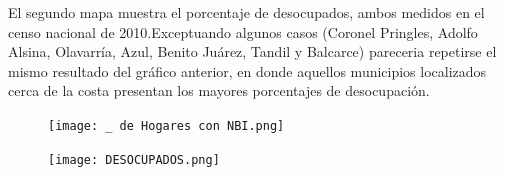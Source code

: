 \documentclass{article}
\begin{document}
El segundo mapa muestra el porcentaje de desocupados, ambos medidos en el censo nacional de 2010.Exceptuando algunos casos (Coronel Pringles, Adolfo Alsina, Olavarría, Azul, Benito Juárez, Tandil y Balcarce) pareceria repetirse el mismo resultado del gráfico anterior, en donde aquellos municipios localizados cerca de la costa presentan los mayores porcentajes de desocupación.



\begin{figure}[htbp]
\centerline{\texttt{[image: \_ de Hogares con NBI.png]}}
\caption{}
\label{fig}
\end{figure}

\begin{figure}[htbp]
\centerline{\texttt{[image: DESOCUPADOS.png]}}
\caption{}
\label{fig}
\end{figure}
\end{document}
